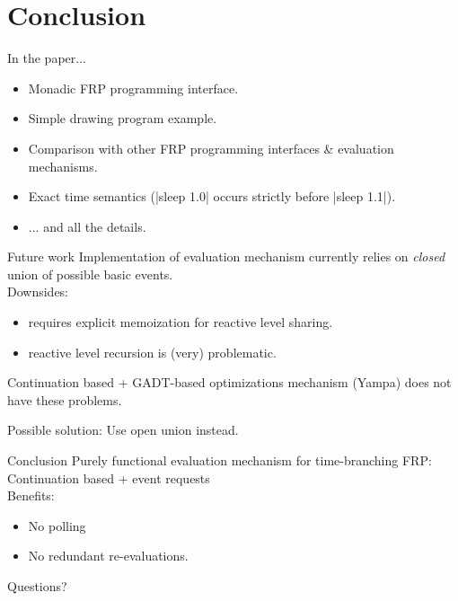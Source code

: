 \documentclass{beamer}
\begin{document}
\section{Conclusion}

\begin{frame}{In the paper...}
\begin{itemize}
\item Monadic FRP programming interface.
\item Simple drawing program example.
\item Comparison with other FRP programming interfaces \& evaluation mechanisms.
\item Exact time semantics (|sleep 1.0| occurs strictly before |sleep 1.1|).

\item ... and all the details.
\end{itemize}

\end{frame}


\begin{frame}{Future work}
Implementation of evaluation mechanism currently relies on \emph{closed} union of possible basic events.\\
Downsides:
\begin{itemize}
\item requires explicit memoization for reactive level sharing.
\item reactive level recursion is (very) problematic.
\end{itemize}
Continuation based + GADT-based optimizations mechanism (Yampa) does not have these problems.\\

\vspace{0.5cm}

Possible solution: Use open union instead.
\end{frame}









\begin{frame}{Conclusion}
\noindent Purely functional evaluation mechanism for time-branching FRP:\\
\hspace{0.5cm}Continuation based + event requests\\
Benefits:
\begin{itemize}
\item No polling
\item No redundant re-evaluations.
\end{itemize}
\pause
Questions?
\end{frame}
\newcommand{\backupbegin}{
   \newcounter{framenumberappendix}
   \setcounter{framenumberappendix}{\value{framenumber}}
}
\newcommand{\backupend}{
   \addtocounter{framenumberappendix}{-\value{framenumber}}
   \addtocounter{framenumber}{\value{framenumberappendix}} 
}
\appendix
\backupbegin
\end{document}
